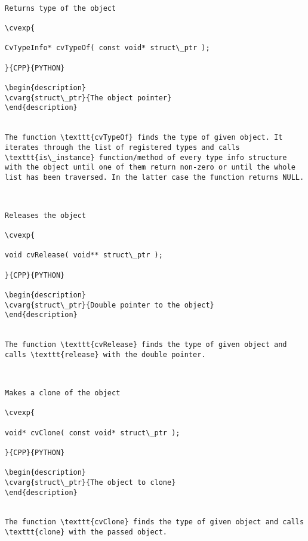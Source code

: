\begin{verbatim}

Returns type of the object

\cvexp{

CvTypeInfo* cvTypeOf( const void* struct\_ptr );

}{CPP}{PYTHON}

\begin{description}
\cvarg{struct\_ptr}{The object pointer}
\end{description}


The function \texttt{cvTypeOf} finds the type of given object. It iterates through the list of registered types and calls \texttt{is\_instance} function/method of every type info structure with the object until one of them return non-zero or until the whole list has been traversed. In the latter case the function returns NULL.


\end{verbatim}
\begin{verbatim}

Releases the object

\cvexp{

void cvRelease( void** struct\_ptr );

}{CPP}{PYTHON}

\begin{description}
\cvarg{struct\_ptr}{Double pointer to the object}
\end{description}


The function \texttt{cvRelease} finds the type of given object and calls \texttt{release} with the double pointer.


\end{verbatim}
\begin{verbatim}

Makes a clone of the object

\cvexp{

void* cvClone( const void* struct\_ptr );

}{CPP}{PYTHON}

\begin{description}
\cvarg{struct\_ptr}{The object to clone}
\end{description}


The function \texttt{cvClone} finds the type of given object and calls \texttt{clone} with the passed object.


\end{verbatim}
